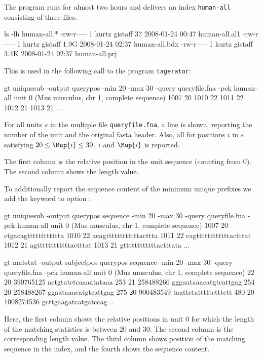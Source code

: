 \documentclass[12pt]{article}
\newcommand{\Program}[0]{\texttt{tagerator}\xspace}
\begin{document}
The program runs for almost two hours and delivers 
an index \texttt{human-all} consisting of three files:

\begin{Output}
ls -lh human-all.*
-rw-r----- 1 kurtz gistaff   37 2008-01-24 00:47 human-all.al1
-rw-r----- 1 kurtz gistaff 1.9G 2008-01-24 02:37 human-all.bdx
-rw-r----- 1 kurtz gistaff 3.4K 2008-01-24 02:37 human-all.prj
\end{Output}

This is used in the following call to the program \Program:

\begin{Output}
gt uniquesub -output querypos -min 20 -max 30 -query queryfile.fna 
             -pck human-all
unit 0 (Mus musculus, chr 1, complete sequence)
1007 20
1010 22
1011 22
1012 21
1013 21
...
\end{Output}

For all units \(s\) in the multiple \Fasta file \texttt{queryfile.fna},
a line is shown, reporting the number of the unit and the original fasta
header. Also, all for positions \(i\) in \(s\) satisfying 
\(20\leq \Mup{i}\leq 30\), \(i\) and \(\Mup{i}\) is reported.

The first column is the relative position in the unit sequence (counting
from 0). The second column shows the length value.

To additionally report the sequence content of the
minimum unique prefixes we add the keyword  to option
:

\begin{Output}
gt uniquesub -output querypos sequence -min 20 -max 30 
             -query queryfile.fna -pck human-all
unit 0 (Mus musculus, chr 1, complete sequence)
1007 20 ctgacagtttttttttttta
1010 22 acagttttttttttttacttta
1011 22 cagttttttttttttactttat
1012 21 agttttttttttttactttat
1013 21 gttttttttttttactttata
...
\end{Output}

\begin{Output}
gt matstat -output subjectpos querypos sequence -min 20 -max 30 
           -query queryfile.fna -pck human-all
unit 0 (Mus musculus, chr 1, complete sequence)
22 20 390765125 actgtatctcaaaatataaa
253 21 258488266 gggaataaacatgtcattgag
254 20 258488267 ggaataaacatgtcattgag
275 20 900483549 taattctatttttctttctt
480 20 1008274536 gcttgaagatcatgatccag
..
\end{Output}
Here, the first column shows the relative positions in unit 0 for which the
length of the matching statistics is between 20 and 30. The second column is
the corresponding length value. The third column shows position of the
matching sequence in the index, and the fourth shows the sequence content.
\end{document}
